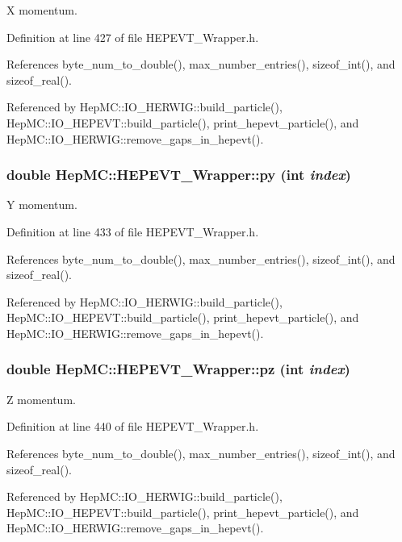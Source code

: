 X momentum. 



Definition at line 427 of file HEPEVT\_\-Wrapper.h.

References byte\_\-num\_\-to\_\-double(), max\_\-number\_\-entries(), sizeof\_\-int(), and sizeof\_\-real().

Referenced by Hep\-MC::IO\_\-HERWIG::build\_\-particle(), Hep\-MC::IO\_\-HEPEVT::build\_\-particle(), print\_\-hepevt\_\-particle(), and Hep\-MC::IO\_\-HERWIG::remove\_\-gaps\_\-in\_\-hepevt().
\subsubsection{\setlength{\rightskip}{0pt plus 5cm}double Hep\-MC::HEPEVT\_\-Wrapper::py (int {\em index})\hspace{0.3cm}{\tt  [inline, static]}}\label{classHepMC_1_1HEPEVT__Wrapper_18a3ef6191eddf2baa8a7197e8301c9e}


Y momentum. 



Definition at line 433 of file HEPEVT\_\-Wrapper.h.

References byte\_\-num\_\-to\_\-double(), max\_\-number\_\-entries(), sizeof\_\-int(), and sizeof\_\-real().

Referenced by Hep\-MC::IO\_\-HERWIG::build\_\-particle(), Hep\-MC::IO\_\-HEPEVT::build\_\-particle(), print\_\-hepevt\_\-particle(), and Hep\-MC::IO\_\-HERWIG::remove\_\-gaps\_\-in\_\-hepevt().
\subsubsection{\setlength{\rightskip}{0pt plus 5cm}double Hep\-MC::HEPEVT\_\-Wrapper::pz (int {\em index})\hspace{0.3cm}{\tt  [inline, static]}}\label{classHepMC_1_1HEPEVT__Wrapper_61047d6f9fbb08bdf286cfaa0be03222}


Z momentum. 



Definition at line 440 of file HEPEVT\_\-Wrapper.h.

References byte\_\-num\_\-to\_\-double(), max\_\-number\_\-entries(), sizeof\_\-int(), and sizeof\_\-real().

Referenced by Hep\-MC::IO\_\-HERWIG::build\_\-particle(), Hep\-MC::IO\_\-HEPEVT::build\_\-particle(), print\_\-hepevt\_\-particle(), and Hep\-MC::IO\_\-HERWIG::remove\_\-gaps\_\-in\_\-hepevt().
